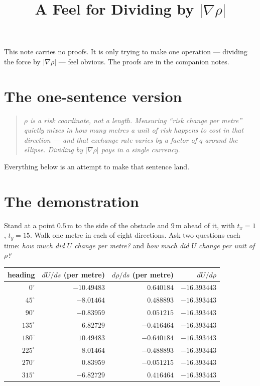 \documentclass[11pt]{article}
\title{A Feel for Dividing by $|\nabla\rho|$}
\author{}
\date{}
\begin{document}
\maketitle

\noindent
This note carries no proofs. It is only trying to make one operation ---
dividing the force by $|\nabla\rho|$ --- feel obvious. The proofs are in the
companion notes.

\section{The one-sentence version}

\begin{quote}
\emph{$\rho$ is a risk coordinate, not a length. Measuring ``risk change per
metre'' quietly mixes in how many metres a unit of risk happens to cost in
that direction --- and that exchange rate varies by a factor of $q$ around
the ellipse. Dividing by $|\nabla\rho|$ pays in a single currency.}
\end{quote}

Everything below is an attempt to make that sentence land.

\section{The demonstration}

Stand at a point $0.5$\,m to the side of the obstacle and $9$\,m ahead of it,
with $t_{x}=1$, $t_{y}=15$. Walk one metre in each of eight directions. Ask
two questions each time: \emph{how much did $U$ change per metre?} and
\emph{how much did $U$ change per unit of $\rho$?}

\begin{center}
\begin{tabular}{rrrr}
\toprule
heading & $dU/ds$ (per metre) & $d\rho/ds$ (per metre) & $dU/d\rho$\\
\midrule
$0^{\circ}$   & $-10.49483$ & $0.640184$  & $-16.393443$\\
$45^{\circ}$  & $-8.01464$  & $0.488893$  & $-16.393443$\\
$90^{\circ}$  & $-0.83959$  & $0.051215$  & $-16.393443$\\
$135^{\circ}$ & $6.82729$   & $-0.416464$ & $-16.393443$\\
$180^{\circ}$ & $10.49483$  & $-0.640184$ & $-16.393443$\\
$225^{\circ}$ & $8.01464$   & $-0.488893$ & $-16.393443$\\
$270^{\circ}$ & $0.83959$   & $-0.051215$ & $-16.393443$\\
$315^{\circ}$ & $-6.82729$  & $0.416464$  & $-16.393443$\\
\bottomrule
\end{tabular}
\end{center}
\end{document}
